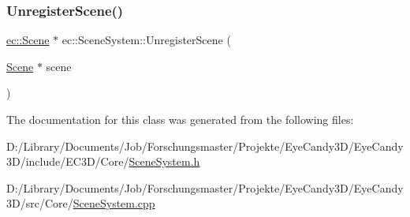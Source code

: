 \mbox{\label{classec_1_1_scene_system_ab3b1d99cc1eff3c7a140be71b5164954}} 
\subsubsection{\texorpdfstring{Unregister\+Scene()}{UnregisterScene()}}
{\footnotesize\ttfamily \mbox{\hyperlink{classec_1_1_scene}{ec\+::\+Scene}} $\ast$ ec\+::\+Scene\+System\+::\+Unregister\+Scene (\begin{DoxyParamCaption}\item[{\mbox{\hyperlink{classec_1_1_scene}{Scene}} $\ast$}]{scene }\end{DoxyParamCaption})}



The documentation for this class was generated from the following files\+:\begin{DoxyCompactItemize}
\item 
D\+:/\+Library/\+Documents/\+Job/\+Forschungsmaster/\+Projekte/\+Eye\+Candy3\+D/\+Eye\+Candy3\+D/include/\+E\+C3\+D/\+Core/\mbox{\hyperlink{_scene_system_8h}{Scene\+System.\+h}}\item 
D\+:/\+Library/\+Documents/\+Job/\+Forschungsmaster/\+Projekte/\+Eye\+Candy3\+D/\+Eye\+Candy3\+D/src/\+Core/\mbox{\hyperlink{_scene_system_8cpp}{Scene\+System.\+cpp}}\end{DoxyCompactItemize}
